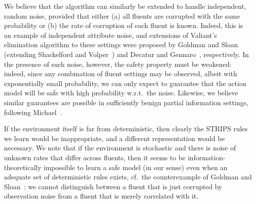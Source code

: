 \documentclass{article}
\begin{document}



We believe that the algorithm can similarly be extended to handle independent, random noise, provided that either (a) all fluents are corrupted with the same probability or (b) the rate of corruption of each fluent is known. Indeed, this is an example of independent attribute noise, and extensions of Valiant's elimination algorithm to these settings were proposed by Goldman and Sloan~ (extending Shackelford and Volper~\citeyear{ShackelfordV1988})
and Decatur and Gennaro~, respectively. In the presence of such noise, however, the safety property must be weakened: indeed, since any combination of fluent settings may be observed, albeit with exponentially small probability, we can only expect to guarantee that the action model will be safe with high probability w.r.t.\ the noise. 
Likewise, we believe similar guarantees are possible in sufficiently benign partial information settings, following Michael~.

If the environment itself is far from deterministic, then clearly the STRIPS rules we learn would be inappropriate, and a different representation would be necessary. We note that if the environment is stochastic and there is noise of unknown rates that differ across fluents, then it seems to be information-theoretically impossible to learn a safe model (in our sense) even when an adequate set of deterministic rules exists, cf.\ the counterexample of Goldman and Sloan~: we cannot distinguish between a fluent that is just corrupted by observation noise from a fluent that is merely correlated with it.
\end{document}
